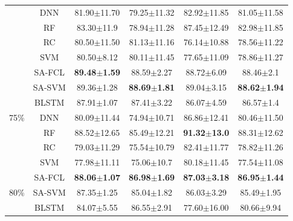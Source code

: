 \begin{table}[h]
\begin{tabular}{c c cccc}
    & DNN & \multicolumn{1}{c}{81.90$\pm$11.70} & \multicolumn{1}{c}{79.25$\pm$11.32} & \multicolumn{1}{c}{82.92$\pm$11.85} & 81.05$\pm$11.58\\
    & RF & \multicolumn{1}{c}{83.30$\pm$11.9} & \multicolumn{1}{c}{78.94$\pm$11.28} & \multicolumn{1}{c}{87.45$\pm$12.49} & 82.98$\pm$11.85\\
    & RC & \multicolumn{1}{c}{80.50$\pm$11.50} & \multicolumn{1}{c}{81.13$\pm$11.16} & \multicolumn{1}{c}{76.14$\pm$10.88} & 78.56$\pm$11.22\\
    & SVM & \multicolumn{1}{c}{80.50$\pm$8.12} & \multicolumn{1}{c}{80.11$\pm$11.45} & \multicolumn{1}{c}{77.65$\pm$11.09} & 78.86$\pm$11.27\\
    \midrule
    \multirow{7}{*}{75\%}
    & SA-FCL & \multicolumn{1}{c}{{\bfseries 89.48$\pm$1.59}} & \multicolumn{1}{c}{88.59$\pm$2.27} & \multicolumn{1}{c}{88.72$\pm$6.09} & {88.46$\pm$2.1}\\
    & SA-SVM & \multicolumn{1}{c}{89.36$\pm$1.28} & \multicolumn{1}{c}{{\bfseries 88.69$\pm$1.81}} & \multicolumn{1}{c}{89.04$\pm$3.15} & {\bfseries 88.62$\pm$1.94}\\
    & BLSTM & \multicolumn{1}{c}{87.91$\pm$1.07} & \multicolumn{1}{c}{87.41$\pm$3.22} & \multicolumn{1}{c}{86.07$\pm$4.59} & 86.57$\pm$1.4\\
    & DNN & \multicolumn{1}{c}{80.09$\pm$11.44} & \multicolumn{1}{c}{74.94$\pm$10.71} & \multicolumn{1}{c}{86.86$\pm$12.41} & 80.46$\pm$11.50\\
    & RF & \multicolumn{1}{c}{88.52$\pm$12.65} & \multicolumn{1}{c}{85.49$\pm$12.21} & \multicolumn{1}{c}{{\bfseries 91.32$\pm$13.0}} & 88.31$\pm$12.62\\
    & RC & \multicolumn{1}{c}{79.03$\pm$11.29} & \multicolumn{1}{c}{75.54$\pm$10.79} & \multicolumn{1}{c}{82.41$\pm$11.77} & 78.82$\pm$11.26\\
    & SVM & \multicolumn{1}{c}{77.98$\pm$11.11} & \multicolumn{1}{c}{75.06$\pm$10.7} & \multicolumn{1}{c}{80.18$\pm$11.45} & 77.54$\pm$11.08\\
    \midrule
    \multirow{7}{*}{80\%}
    & SA-FCL & \multicolumn{1}{c}{{\bfseries 88.06$\pm$1.07}} & \multicolumn{1}{c}{{\bfseries 86.98$\pm$1.69}} & \multicolumn{1}{c}{{\bfseries 87.03$\pm$3.18}} & {\bfseries 86.95$\pm$1.44}\\
    & SA-SVM & \multicolumn{1}{c}{87.35$\pm$1.25} & \multicolumn{1}{c}{85.04$\pm$1.82} & \multicolumn{1}{c}{86.03$\pm$3.29} & {85.49$\pm$1.95}\\
    & BLSTM & \multicolumn{1}{c}{84.07$\pm$5.55} & \multicolumn{1}{c}{86.55$\pm$2.91} & \multicolumn{1}{c}{77.60$\pm$16.00} & 80.66$\pm$9.94\\

\end{tabular}
\end{table}

